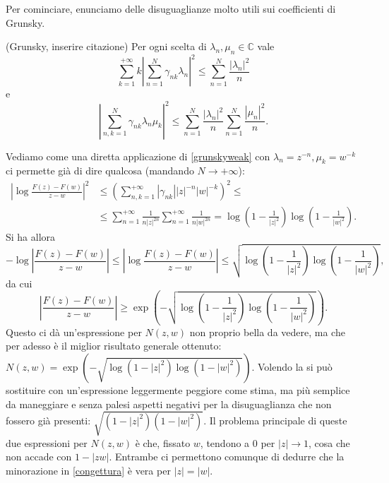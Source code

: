 Per cominciare, enunciamo delle disuguaglianze molto utili sui coefficienti di Grunsky.
\begin{thm}
  (Grunsky, inserire citazione) Per ogni scelta di $\lambda_n, \mu_n \in \mathbb{C}$ vale
  \begin{equation}\label{grunskystrong}
    \sum_{k=1}^{+\infty} k\left|\sum_{n=1}^N\gamma_{nk}\lambda_n\right|^2 \le \sum_{n=1}^N \frac{|\lambda_n|^2}{n}
  \end{equation}
  e
  \begin{equation}\label{grunskyweak}
    \left|\sum_{n,k=1}^N \gamma_{nk}\lambda_n\mu_k\right|^2 \le \sum_{n=1}^N \frac{|\lambda_n|^2}{n}\sum_{n=1}^N \frac{|\mu_n|^2}{n}.
  \end{equation}
\end{thm}
Vediamo come una diretta applicazione di \eqref{grunskyweak} con $\lambda_n=z^{-n},\mu_k=w^{-k}$ ci permette già di dire qualcosa (mandando $N \longrightarrow +\infty$):
\begin{align*}
  \left|\log{\frac{F(z)-F(w)}{z-w}}\right|^2 &\le \left(\sum_{n,k=1}^{+\infty} |\gamma_{nk}||z|^{-n}|w|^{-k}\right)^2 \le \\
  &\le \sum_{n=1}^{+\infty} \frac{1}{n|z|^{2n}}\sum_{n=1}^{+\infty} \frac{1}{n|w|^{2n}}=\log\left(1-\frac{1}{|z|^2}\right)\log\left(1-\frac{1}{|w|^2}\right).
\end{align*}
Si ha allora
$$-\log{\left|\frac{F(z)-F(w)}{z-w}\right|} \le \left|\log{\frac{F(z)-F(w)}{z-w}}\right| \le \sqrt{\log\left(1-\frac{1}{|z|^2}\right)\log\left(1-\frac{1}{|w|^2}\right)},$$
da cui
$$\left|\frac{F(z)-F(w)}{z-w}\right| \ge \exp\left(-\sqrt{\log\left(1-\frac{1}{|z|^2}\right)\log\left(1-\frac{1}{|w|^2}\right)}\right).$$
Questo ci dà un'espressione per $N(z,w)$ non proprio bella da vedere, ma che per adesso è il miglior risultato generale ottenuto: \\
$N(z,w)=\exp\left(-\sqrt{\log\left(1-|z|^2\right)\log\left(1-|w|^2\right)}\right)$. Volendo la si può sostituire con un'espressione leggermente peggiore come stima, ma più semplice da maneggiare e senza palesi aspetti negativi per la disuguaglianza che non fossero già presenti: $\sqrt{(1-|z|^2)(1-|w|^2)}$. Il problema principale di queste due espressioni per $N(z,w)$ è che, fissato $w$, tendono a $0$ per $|z| \longrightarrow 1$, cosa che non accade con $1-|zw|$. Entrambe ci permettono comunque di dedurre che la minorazione in \eqref{congettura} è vera per $|z|=|w|$.
